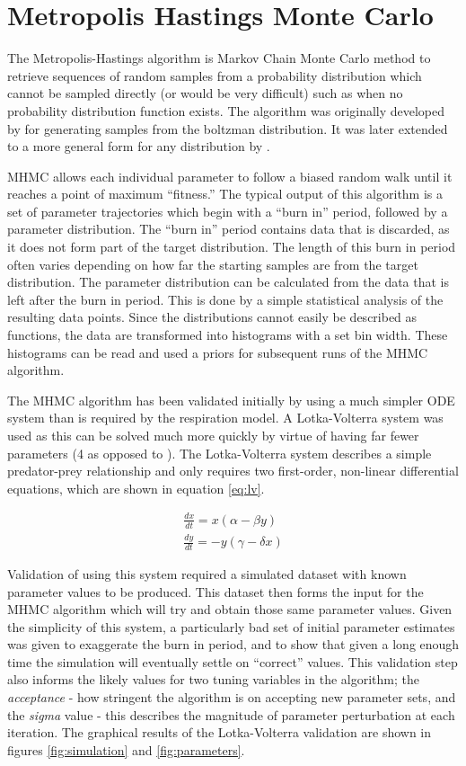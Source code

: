 \section{Metropolis Hastings Monte Carlo}

The Metropolis-Hastings algorithm is Markov Chain Monte Carlo method to retrieve sequences of random samples from a probability distribution which cannot be sampled directly (or would be very difficult) such as when no probability distribution function exists. The algorithm was originally developed by \citet{Metropolis1953} for generating samples from the boltzman distribution. It was later extended to a more general form for any distribution by \citet{Hastings1970}.

MHMC allows each individual parameter to follow a biased random walk until it reaches a point of maximum ``fitness.'' The typical output of this algorithm is a set of parameter trajectories which begin with a ``burn in'' period, followed by a parameter distribution. The ``burn in'' period contains data that is discarded, as it does not form part of the target distribution. The length of this burn in period often varies depending on how far the starting samples are from the target distribution. The parameter distribution can be calculated from the data that is left after the burn in period. This is done by a simple statistical analysis of the resulting data points. Since the distributions cannot easily be described as functions, the data are transformed into histograms with a set bin width. These histograms can be read and used a priors for subsequent runs of the MHMC algorithm.

The MHMC algorithm has been validated initially by using a much simpler ODE system than is required by the respiration model. A Lotka-Volterra system was used as this can be solved much more quickly by virtue of having far fewer parameters (4 as opposed to ). The Lotka-Volterra system describes a simple predator-prey relationship and only requires two first-order, non-linear differential equations, which are shown in equation \ref{eq:lv}.

\begin{eqnarray}
\frac{dx}{dt} = x (\alpha - \beta y)\nonumber \\
\frac{dy}{dt} = -y (\gamma - \delta x)
\label{eq:lv}
\end{eqnarray}

Validation of using this system required a simulated dataset with known parameter values to be produced. This dataset then forms the input for the MHMC algorithm which will try and obtain those same parameter values. Given the simplicity of this system, a particularly bad set of initial parameter estimates was given to exaggerate the burn in period, and to show that given a long enough time the simulation will eventually settle on ``correct'' values. This validation step also informs the likely values for two tuning variables in the algorithm; the \textit{acceptance} - how stringent the algorithm is on accepting new parameter sets, and the \textit{sigma} value - this describes the magnitude of parameter perturbation at each iteration.
The graphical results of the Lotka-Volterra validation are shown in figures \ref{fig:simulation} and \ref{fig:parameters}.

